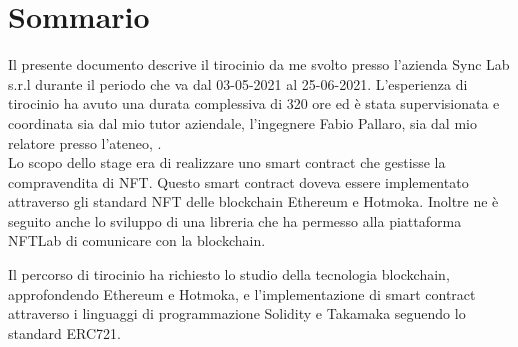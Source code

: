 
\cleardoublepage
{}
{}
\begingroup
\let\clearpage\relax
\let\cleardoublepage\relax
\let\cleardoublepage\relax

\chapter*{Sommario}

Il presente documento descrive il tirocinio da me svolto presso l'azienda Sync Lab s.r.l durante il periodo che va dal 03-05-2021 al 25-06-2021.
L'esperienza di tirocinio ha avuto una durata complessiva di 320 ore ed è stata supervisionata e coordinata sia dal mio tutor aziendale, l'ingegnere Fabio Pallaro, sia dal mio relatore presso l'ateneo, \profTitle{} \myProf. \\

\noindent Lo scopo dello stage era di realizzare uno smart contract che gestisse la compravendita di NFT. Questo smart contract doveva essere implementato attraverso gli standard NFT delle blockchain Ethereum e Hotmoka. Inoltre ne è seguito anche lo sviluppo di una libreria che ha permesso alla piattaforma NFTLab di comunicare con la blockchain.

\noindent Il percorso di tirocinio ha richiesto lo studio della tecnologia blockchain, approfondendo Ethereum e Hotmoka, e l'implementazione di smart contract attraverso i linguaggi di programmazione Solidity e Takamaka seguendo lo standard ERC721. \\

